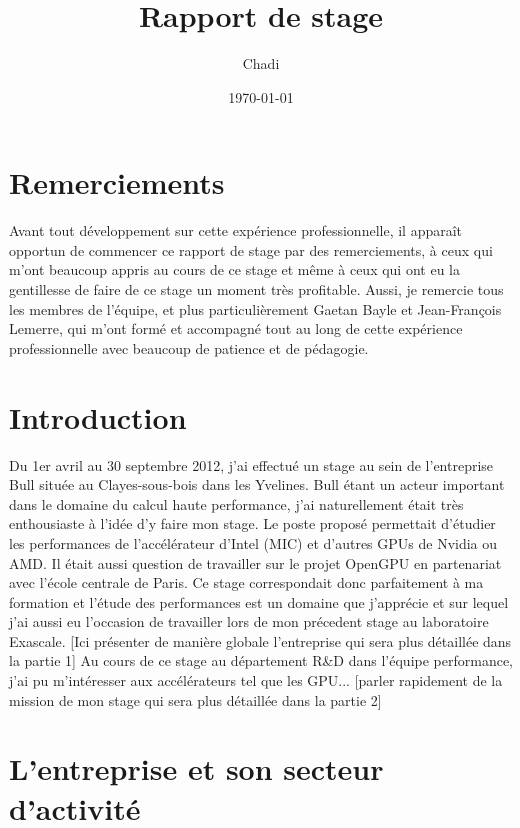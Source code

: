 \documentclass{article}
\title{Rapport de stage}
\author{Chadi \bsc{AKEL}}
\date{\today}
\begin{document}
\pagestyle{fancy}
\lhead{\thepart}
\chead{}
\lfoot{}
\cfoot{\thepage}
\rfoot{}
\maketitle
\newpage
{}
\renewcommand{\contentsname}{Sommaire}
\tableofcontents

\newpage
{}
\part{Remerciements}
	Avant tout développement sur cette expérience professionnelle, il apparaît opportun de commencer ce rapport de stage par 
	des remerciements, à ceux qui m'ont beaucoup appris au cours de ce stage et même à ceux qui ont eu la gentillesse de faire 
	de ce stage un moment très profitable. Aussi, je remercie tous les membres de l'équipe, et plus particulièrement 
	Gaetan Bayle et Jean-François Lemerre, qui m'ont formé et accompagné tout au long de cette expérience professionnelle 
	avec beaucoup de patience et de pédagogie.

\newpage
{}
\part{Introduction}
	Du 1er avril au 30 septembre 2012, j’ai effectué un stage au sein de l’entreprise Bull située au Clayes-sous-bois 
	dans les Yvelines. Bull étant un acteur important dans le domaine du calcul haute performance, j'ai naturellement 
	était très enthousiaste à l'idée d'y faire mon stage. Le poste proposé permettait d'étudier les performances de 
	l'accélérateur d'Intel (MIC) et d'autres GPUs de Nvidia ou AMD. Il était aussi question de travailler sur le projet 
	OpenGPU en partenariat avec l'école centrale de Paris. Ce stage correspondait donc parfaitement à ma formation et 
	l'étude des performances est un domaine que j'apprécie et sur lequel j'ai aussi eu l'occasion de travailler lors de 
	mon précedent stage au laboratoire Exascale.
	[Ici présenter de manière globale l'entreprise qui sera plus détaillée dans la partie 1]
	Au cours de ce stage au département R\&D dans l'équipe performance, j’ai pu m’intéresser aux accélérateurs tel que les GPU... 
	[parler rapidement de la mission de mon stage qui sera plus détaillée dans la partie 2]

\newpage
{}
\part{L'entreprise et son secteur d'activité}
\end{document}

